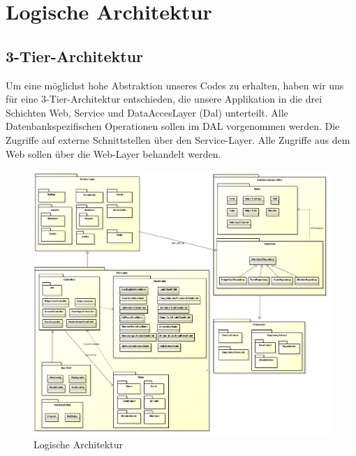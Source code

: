 \chapter{Logische Architektur}
\section{3-Tier-Architektur}
	Um eine möglichst hohe Abstraktion unseres Codes zu erhalten, haben wir uns für eine 3-Tier-Architektur entschieden, die unsere Applikation in die drei Schichten Web, Service und DataAccesLayer (Dal) unterteilt. Alle Datenbankspezifischen Operationen sollen im DAL vorgenommen werden. Die Zugriffe auf externe Schnittstellen über den Service-Layer. Alle Zugriffe aus dem Web sollen über die Web-Layer behandelt werden. 
    \begin{figure}[h]
  		\vspace{-5pt}
    	\centering
		\includegraphics[width=\textwidth]{content/architekturdokumentation/images/LogischeArchitektur.png}
  		\vspace{-20pt}
    	\caption{Logische Architektur}
	\end{figure}

\newpage
